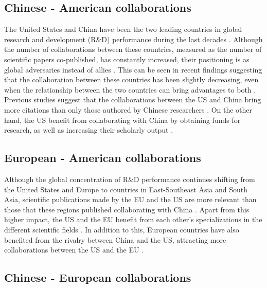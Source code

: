 \subsection{Chinese - American collaborations}
The United States and China have been the two leading countries in global research and development (R\&D) performance during the last decades \citep{burke2022state}. Although the number of collaborations between these countries, measured as the number of scientific papers co-published, has constantly increased, their positioning is as global adversaries instead of allies \citep{wagner2015recent,lee2020winners,zhao2022one,lewis2021time}. This can be seen in recent findings suggesting that the collaboration between these countries has been slightly decreasing, even when the relationship between the two countries can bring advantages to both \citep{wagner2022changes,wagner2022drop,cai2021international}. Previous studies suggest that the collaborations between the US and China bring more citations than only those authored by Chinese researchers \citep{tang2011china}. On the other hand, the US benefit from collaborating with China by obtaining funds for research, as well as increasing their scholarly output \citep{lee2020winners}.

\subsection{European - American collaborations}

Although the global concentration of R\&D performance continues shifting from the United States and Europe to countries in East-Southeast Asia and South Asia, scientific publications made by the EU and the US are more relevant than those that these regions published collaborating with China \citep{leydesdorff2014european, burke2022state}. Apart from this higher impact, the US and the EU benefit from each other’s specializations in the different scientific fields \citep{burke2022state}. In addition to this, European countries have also benefited from the rivalry between China and the US, attracting more collaborations between the US and the EU \citep{schuller2020united,wagner2022drop,cai2021international}.

\subsection{Chinese - European collaborations}

